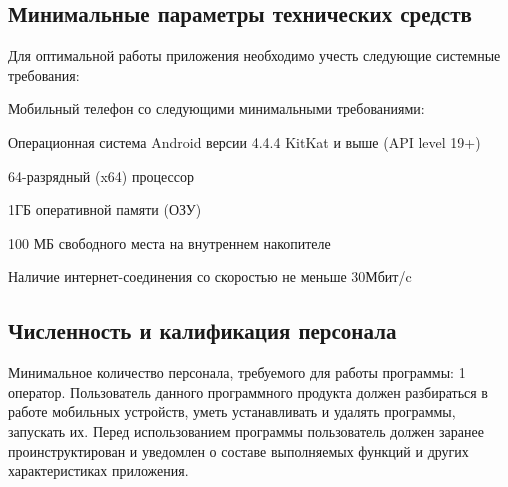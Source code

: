 \subsection{Минимальные параметры технических средств}
Для оптимальной работы приложения необходимо учесть следующие системные требования:
\begin{my_enumerate}
    \item Мобильный телефон со следующими минимальными требованиями:
    \begin{my_enumerate}
        \item Операционная система Android версии 4.4.4 KitKat и выше (API level 19+)
        \item 64-разрядный (x64) процессор
        \item 1ГБ оперативной памяти (ОЗУ)
        \item 100 МБ свободного места на внутреннем накопителе
    \end{my_enumerate}
    \item Наличие интернет-соединения со скоростью не меньше 30Мбит/c
\end{my_enumerate}


\subsection{Численность и калификация персонала}
Минимальное количество персонала, требуемого для работы программы: 1 оператор.
Пользователь данного программного продукта должен разбираться в работе
мобильных устройств, уметь устанавливать и удалять программы, запускать их.
Перед использованием программы пользователь должен заранее проинструктирован и
уведомлен о составе выполняемых функций и других характеристиках приложения.

